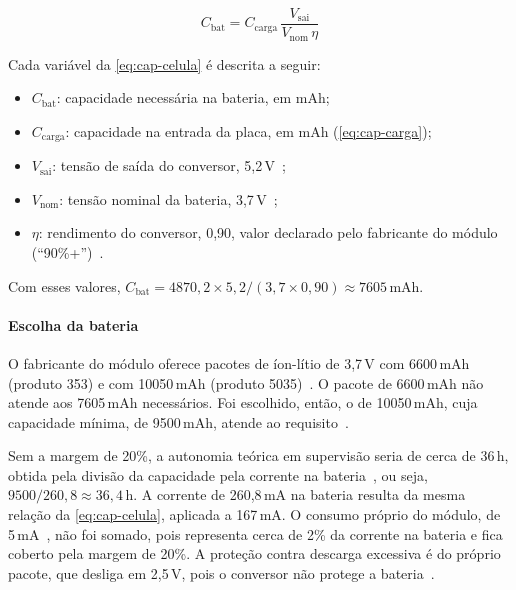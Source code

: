 \begin{equation}
\label{eq:cap-celula}
C_{\mathrm{bat}} = C_{\mathrm{carga}}\,
\frac{V_{\mathrm{sai}}}{V_{\mathrm{nom}}\,\eta}
\end{equation}

Cada variável da \autoref{eq:cap-celula} é descrita a seguir:

\begin{itemize}
  \item $C_{\mathrm{bat}}$: capacidade necessária na bateria, em mAh;
  \item $C_{\mathrm{carga}}$: capacidade na entrada da placa, em mAh
        (\autoref{eq:cap-carga});
  \item $V_{\mathrm{sai}}$: tensão de saída do conversor, 5,2\,V~\cite{adafruit_powerboost1000c};
  \item $V_{\mathrm{nom}}$: tensão nominal da bateria, 3,7\,V~\cite{adafruit_5035};
  \item $\eta$: rendimento do conversor, 0,90, valor declarado pelo
        fabricante do módulo (``90\%+'')~\cite{adafruit_powerboost1000c}.
\end{itemize}

Com esses valores,
$C_{\mathrm{bat}} = 4870{,}2 \times 5{,}2 / (3{,}7 \times 0{,}90)
\approx 7605$\,mAh.

\paragraph*{Escolha da bateria}

O fabricante do módulo oferece pacotes de íon-lítio de 3,7\,V com
6600\,mAh (produto 353) e com 10050\,mAh (produto 5035)~\cite{adafruit_353,adafruit_5035}. O pacote de 6600\,mAh não atende aos
7605\,mAh necessários. Foi escolhido, então, o de 10050\,mAh, cuja capacidade
mínima, de 9500\,mAh, atende ao requisito~\cite{adafruit_5035}.

Sem a margem de 20\%, a autonomia teórica em supervisão seria de cerca
de 36\,h, obtida pela divisão da capacidade pela corrente na bateria~\cite{bu402_crate}, ou seja, $9500/260{,}8 \approx 36{,}4$\,h. A corrente de
260,8\,mA na bateria resulta da mesma relação da
\autoref{eq:cap-celula}, aplicada a 167\,mA.
O consumo próprio do módulo, de 5\,mA~\cite{adafruit_2465_produto}, não foi somado, pois representa cerca de 2\% da corrente na bateria e fica
coberto pela margem de 20\%. A proteção contra descarga excessiva é do
próprio pacote, que desliga em 2,5\,V, pois o conversor não protege a
bateria~\cite{adafruit_5035}.

